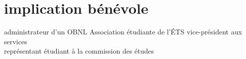 \documentclass[]{friggeri-cv}
\newif\ifenglish
\begin{document}
\ifenglish\section{implication bénévole}\else\section{implication bénévole}\fi
\begin{entrylist}
  \ifenglish
    \entry {depuis 2013} {administrateur d'un OBNL} {Association étudiante de l'ÉTS} {vice-président aux services\\représentant étudiant à la commission des études}
  \else
     {administrateur d'un OBNL} {Association étudiante de l'ÉTS} {vice-président aux services\\représentant étudiant à la commission des études}
  \fi
\end{entrylist}
\newpage
\end{document}
